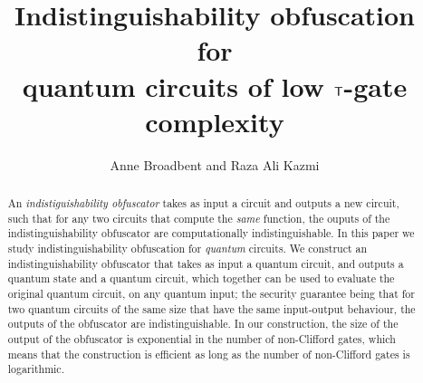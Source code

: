 \documentclass[english,11pt]{article}
\title{Indistinguishability obfuscation \\for\\ quantum circuits of low ${\sf T}$-gate complexity}
\author{Anne Broadbent and Raza Ali Kazmi}
\affil{University of Ottawa, Department of Mathematics and Statistics,\\\texttt{\{abroadbe,rkazmi\}@uottawa.ca.}}
\date{} %
\begin{document}
\maketitle

\begin{abstract}
An \emph{indistiguishability obfuscator} takes as input a circuit %
and outputs a new circuit, %
such that for any two circuits that compute the  \emph{same} function, the ouputs of the indistinguishability obfuscator are 
 computationally indistinguishable. In this paper we study indistinguishability obfuscation for \emph{quantum} circuits. We construct an indistinguishability  obfuscator that takes as input a quantum circuit, and outputs a quantum state and a quantum circuit, which together can be used to evaluate the original quantum circuit, on any quantum input; the security guarantee being that for two quantum circuits of the same size that have the same input-output behaviour, the outputs of the obfuscator are indistinguishable. In our construction, the size of the output of the obfuscator is exponential in the number of non-Clifford gates, which means that the construction is efficient as long as the number of non-Clifford gates is logarithmic. 
\end{abstract}

\newpage

\setcounter{tocdepth}{2}
\tableofcontents
\clearpage
{}
\setcounter{page}{1}







%



%
\end{document}
